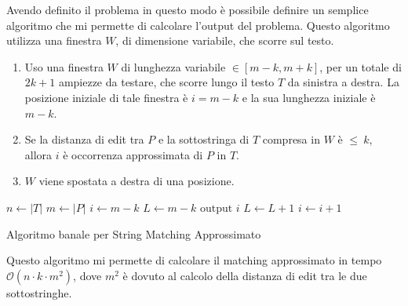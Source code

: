Avendo definito il problema in questo modo è possibile definire un semplice
algoritmo che mi permette di calcolare l'output del problema. Questo algoritmo
utilizza una finestra $W$, di dimensione variabile, che scorre sul testo.
\begin{enumerate}
    \item Uso una finestra $W$ di lunghezza variabile $\in [m - k, m + k]$, per
          un totale di $2k+1$ ampiezze da testare, che scorre lungo il testo $T$ da
          sinistra a destra. La posizione iniziale di tale finestra è $i = m - k$ e
          la sua lunghezza iniziale è $m - k$.
    \item Se la distanza di edit tra $P$ e la sottostringa di $T$ compresa in $W$
          è $\leq \ k$, allora $i$ è occorrenza approssimata di $P$ in $T$.
    \item $W$ viene spostata a destra di una posizione.
\end{enumerate}
\begin{algorithm}
    \begin{algorithmic}
        \State $n\gets |T|$
        \State $m \gets |P|$
        \State $i\gets m - k$
        \State $L \gets  m - k$
        \State $\text{output } i$
        \EndIf
        \State $L \gets L + 1$
        \EndWhile
        \State $i \gets i + 1$
        \EndWhile
        \EndFunction
    \end{algorithmic}
    \caption{Algoritmo banale per String Matching Approssimato}
\end{algorithm}
Questo algoritmo mi permette di calcolare il matching approssimato in tempo
$\mathcal{O}(n \cdot k \cdot m^2)$, dove $m^2$ è dovuto al calcolo della distanza
di edit tra le due sottostringhe.
